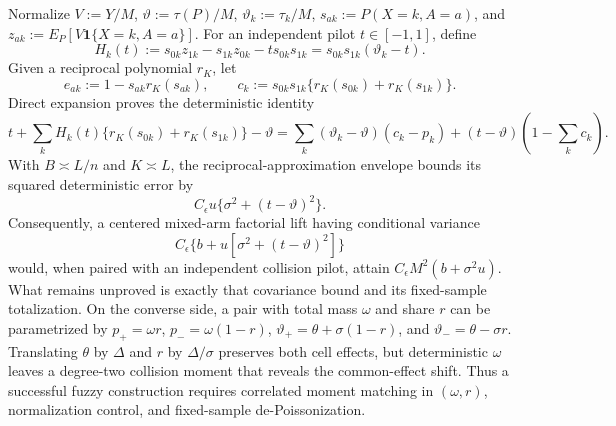 Normalize \(V:=Y/M\), \(\vartheta:=\tau(P)/M\), \(\vartheta_k:=\tau_k/M\), \(s_{ak}:=P(X=k,A=a)\), and \(z_{ak}:=E_P[V\mathbf 1\{X=k,A=a\}]\).  For an independent pilot \(t\in[-1,1]\), define
\[
 H_k(t):=s_{0k}z_{1k}-s_{1k}z_{0k}-t s_{0k}s_{1k}
 =s_{0k}s_{1k}(\vartheta_k-t).
\]
Given a reciprocal polynomial \(r_K\), let
\[
 e_{ak}:=1-s_{ak}r_K(s_{ak}),\qquad
 c_k:=s_{0k}s_{1k}\{r_K(s_{0k})+r_K(s_{1k})\}.
\]
Direct expansion proves the deterministic identity
\[
 t+\sum_kH_k(t)\{r_K(s_{0k})+r_K(s_{1k})\}-\vartheta
 =\sum_k(\vartheta_k-\vartheta)(c_k-p_k)
 +(t-\vartheta)\left(1-\sum_kc_k\right).
\]
With \(B\asymp L/n\) and \(K\asymp L\), the reciprocal-approximation envelope bounds its squared deterministic error by
\[
 C_{\epsilon}u\{\sigma^2+(t-\vartheta)^2\}.
\]
Consequently, a centered mixed-arm factorial lift having conditional variance
\[
 C_{\epsilon}\{b+u[\sigma^2+(t-\vartheta)^2]\}
\]
would, when paired with an independent collision pilot, attain \(C_{\epsilon}M^2(b+\sigma^2u)\).  What remains unproved is exactly that covariance bound and its fixed-sample totalization.  On the converse side, a pair with total mass \(\omega\) and share \(r\) can be parametrized by \(p_+=\omega r\), \(p_-=\omega(1-r)\), \(\vartheta_+=\theta+\sigma(1-r)\), and \(\vartheta_-=\theta-\sigma r\).  Translating \(\theta\) by \(\Delta\) and \(r\) by \(\Delta/\sigma\) preserves both cell effects, but deterministic \(\omega\) leaves a degree-two collision moment that reveals the common-effect shift.  Thus a successful fuzzy construction requires correlated moment matching in \((\omega,r)\), normalization control, and fixed-sample de-Poissonization.